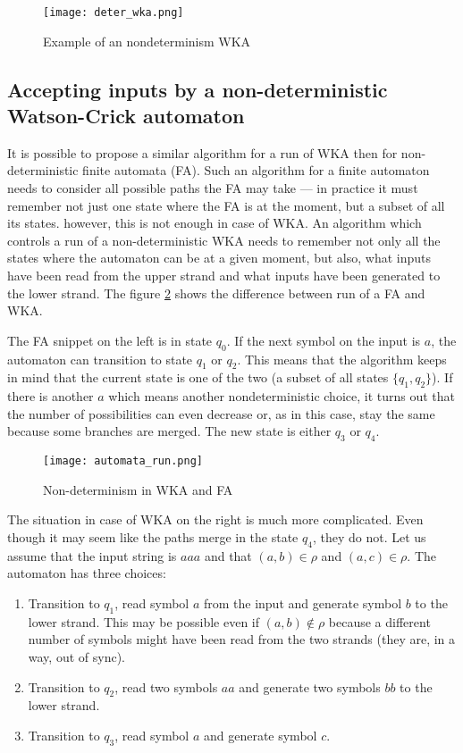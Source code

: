 \begin{figure}[h]
  \centering
  \texttt{[image: deter\_wka.png]}
  \caption{Example of an nondeterminism WKA}
  \label{fig:deter_WKA}
\end{figure}


\subsection{Accepting inputs by a non-deterministic Watson-Crick automaton}
It is possible to propose a similar algorithm for a run of WKA then for non-deterministic finite automata (FA). Such an algorithm for a finite automaton needs to consider all possible paths the FA may take --- in practice it must remember not just one state where the FA is at the moment, but a subset of all its states. however, this is not enough in case of WKA. An algorithm which controls a run of a non-deterministic WKA needs to remember not only all the states where the automaton can be at a given moment, but also, what inputs have been read from the upper strand and what inputs have been generated to the lower strand. The figure \ref{fig:automata_run} shows the difference between run of a FA and WKA.

The FA snippet on the left is in state $q_0$. If the next symbol on the input is $a$, the automaton can transition to state $q_1$ or $q_2$. This means that the algorithm keeps in mind that the current state is one of the two (a subset of all states $\{q_1, q_2\}$). If there is another $a$ which means another nondeterministic choice, it turns out that the number of possibilities can even decrease or, as in this case, stay the same because some branches are merged. The new state is either $q_3$ or $q_4$.

\begin{figure}[h]
  \centering
  \texttt{[image: automata\_run.png]}
  \caption{Non-determinism in WKA and FA}
  \label{fig:automata_run}
\end{figure}

The situation in case of WKA on the right is much more complicated. Even though it may seem like the paths merge in the state $q_4$, they do not. Let us assume that the input string is $aaa$ and that $(a, b) \in \rho$ and $(a, c) \in \rho$. The automaton has three choices:

\begin{enumerate}
  \item{Transition to $q_1$, read symbol $a$ from the input and generate symbol $b$ to the lower strand. This may be possible even if $(a, b) \notin \rho$ because a different number of symbols might have been read from the two strands (they are, in a way, out of sync).}

  \item{Transition to $q_2$, read two symbols $aa$ and generate two symbols $bb$ to the lower strand.}

  \item{Transition to $q_3$, read symbol $a$ and generate symbol $c$.}
\end{enumerate}

